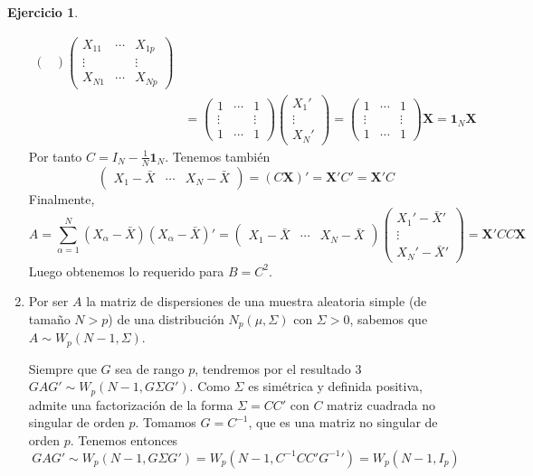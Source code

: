 \documentclass[12pt,spanish]{article}
\theoremstyle{definition}
\newtheorem{exercise}{Ejercicio}
\begin{document}
\begin{exercise}
\begin{enumerate}[$a)$]
\begin{align*}
\begin{pmatrix}
    \end{pmatrix}
    \begin{pmatrix}
      X_{11} & \cdots & X_{1p} \\ \vdots & & \vdots \\ X_{N1} & \cdots & X_{Np}
    \end{pmatrix}\\&=\begin{pmatrix}
      1 & \cdots & 1 \\ \vdots & & \vdots \\ 1 & \cdots & 1
    \end{pmatrix}
    \begin{pmatrix}
      X_1' \\ \vdots \\ X_N'
    \end{pmatrix}=
    \begin{pmatrix}
      1 & \cdots & 1 \\ \vdots & & \vdots \\ 1 & \cdots & 1
    \end{pmatrix}
    \textbf{X}=\textbf{1}_N\textbf{X}
  \end{align*}
  Por tanto $C=I_N-\frac{1}{N}\textbf{1}_N$.
Tenemos también
\[
  \begin{pmatrix}
    X_1-\bar{X} & \cdots & X_N-\bar{X}
  \end{pmatrix}=(C\textbf{X})'=\textbf{X}'C'=\textbf{X}'C
\]
Finalmente,
\[A=\sum_{\alpha=1}^N(X_\alpha-\bar{X})(X_\alpha-\bar{X})'=\begin{pmatrix}
    X_1-\bar{X} & \cdots & X_N-\bar{X}
  \end{pmatrix}\begin{pmatrix}
      X_1'-\bar{X}' \\ \vdots \\ X_N'-\bar{X}'
    \end{pmatrix}=\textbf{X}'CC\textbf{X}\]
  Luego obtenemos lo requerido para $B=C^2$.

\item Por ser $A$ la matriz de dispersiones de una muestra aleatoria
  simple (de tamaño $N>p$) de una distribución $N_p(\mu,\Sigma)$ con
  $\Sigma>0$, sabemos que $A\sim W_p(N-1,\Sigma)$.

  Siempre que $G$ sea de rango $p$, tendremos por el resultado 3
  $GAG'\sim W_p(N-1, G\Sigma G')$. Como $\Sigma$ es simétrica y
  definida positiva, admite una factorización de la forma $\Sigma=CC'$
  con $C$ matriz cuadrada no singular de orden $p$. Tomamos
  $G=C^{-1}$, que es una matriz no singular de orden $p$. Tenemos entonces
  \[GAG'\sim W_p(N-1, G\Sigma G')=W_p(N-1, C^{-1}C C' {G^{-1}}')=W_p(N-1, I_p)\]
\end{enumerate}
\end{exercise}
\end{document}
